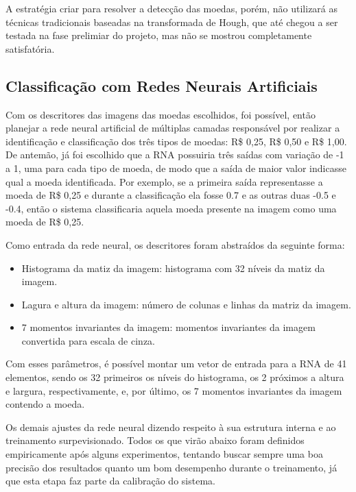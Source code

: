 \documentclass[10pt,journal,compsoc]{IEEEtran}
\begin{document}
A estratégia criar para resolver a detecção das moedas, porém, não utilizará as técnicas tradicionais baseadas na transformada de Hough, que até chegou a ser testada na fase prelimiar do projeto, mas não se mostrou completamente satisfatória.


\subsection{Classificação com Redes Neurais Artificiais}
\label{sec:metodologia:rna}


Com os descritores das imagens das moedas escolhidos, foi possível, então planejar a rede neural artificial de múltiplas camadas responsável por realizar a identificação e classificação dos três tipos de moedas: R\$ 0,25, R\$ 0,50 e R\$ 1,00. De antemão, já foi escolhido que a RNA possuiria três saídas com variação de -1 a 1, uma para cada tipo de moeda, de modo que a saída de maior valor indicasse qual a moeda identificada. Por exemplo, se a primeira saída representasse a moeda de R\$ 0,25 e durante a classificação ela fosse 0.7 e as outras duas -0.5 e -0.4, então o sistema classificaria aquela moeda presente na imagem como uma moeda de R\$ 0,25.

Como entrada da rede neural, os descritores foram abstraídos da seguinte forma:

\begin{itemize}  
\item Histograma da matiz da imagem: histograma com 32 níveis da matiz da imagem.
\item Lagura e altura da imagem: número de colunas e linhas da matriz da imagem.
\item 7 momentos invariantes da imagem: momentos invariantes da imagem convertida para escala de cinza.
\end{itemize}

Com esses parâmetros, é possível montar um vetor de entrada para a RNA  de 41 elementos, sendo os 32 primeiros os níveis do histograma, os 2 próximos a altura e largura, respectivamente, e, por último, os 7 momentos invariantes da imagem contendo a moeda. 

Os demais ajustes da rede neural dizendo respeito à sua estrutura interna e ao treinamento surpevisionado. Todos os que virão abaixo foram definidos empiricamente após alguns experimentos, tentando buscar sempre uma boa precisão dos resultados quanto um bom desempenho durante o treinamento, já que esta etapa faz parte da calibração do sistema.
\end{document}
